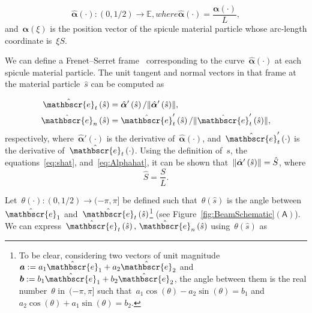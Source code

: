 \documentclass[preprint,10pt,times]{elsarticle}
\numberwithin{equation}{section}
\newcommand{\ndL}{L}
\newcommand{\physe}{\hat{\mathbscr{e}}} %
\renewcommand{\u}[1]{\boldsymbol{#1}}
\newcommand{\pr}[1]{\left( #1 \right)}
\newcommand{\norm}[1]{\ensuremath \lVert #1 \rVert}
\newcommand{\subf}[1]{\pr{\textsf{#1}}}
\begin{document}
\begin{subequations}
\begin{equation}
\hat{\u{\alpha}}(\cdot):(0,1/2)\to\mathbb{E},
\end{equation}
where
\begin{equation}
\hat{\u{\alpha}}\pr{\cdot} =\frac{\u{\alpha}\pr{\cdot}}{\ndL} ,
\end{equation}
\label{eq:Alphahat}
\end{subequations}
and~$\u{\alpha}\pr{\xi}$ is the position vector
of the spicule material particle whose arc-length coordinate is~$\xi S$.

We can define a Frenet--Serret frame~\cite{forsyth1912lectures}
corresponding to the curve~$\hat{\u{\alpha}}(\cdot)$
at each spicule material particle. The unit tangent and normal vectors
in that frame at the material particle~$\hat{s}$ can be computed
as

\begin{subequations}
\begin{align}
\label{eq:Tvec}
\physe_{t}\pr{\hat{s}}&=\hat{\u{\alpha}}'\pr{\hat{s}}/\norm{\hat{\u{\alpha}}'\pr{\hat{s}}},\\
\label{eq:Nvec}
\physe_{n}\pr{\hat{s}}&=\physe_{t}'\pr{\hat{s}}/\norm{\physe_{t}'\pr{\hat{s}}},
\end{align}
\end{subequations}respectively, where~$\hat{\u{\alpha}}'\pr{\cdot}$ is the derivative
of~$\hat{\u{\alpha}}\pr{\cdot}$, and~$\physe_{t}'\pr{\cdot}$ is
the derivative of~$\physe_{t}\pr{\cdot}$. Using the definition of~$s$,
the equations~\eqref{eq:shat}, and~\eqref{eq:Alphahat}, it can
be shown that~$\norm{\hat{\u{\alpha}}'\pr{\hat{s}}} =\hat{S}${,
where}\begin{equation}\label{eq:Shat}
\hat{S} =\frac{S}{\ndL}  .\end{equation}

Let~$\theta\pr{\cdot}:(0,1/2)\to (-\pi,\pi]$
be defined such that~$\theta\pr{\hat{s}}$ is
the angle between~$\physe_1$ and~$\physe_{t}\pr{\hat{s}}$\footnote{To be clear, considering two vectors of unit magnitude~$\u{a} := a_1\physe_1 + a_2\physe_2$
and~$\u{b}:=b_1\physe_1 + b_2\physe_2$, the angle between them is
the real number~$\theta$ in~$(-\pi,\pi]$ such that~$a_1\cos(\theta)- a_2\sin(\theta) = b_1$
and~$a_2\cos(\theta) + a_1\sin(\theta) = b_2$.} (see Figure~\ref{fig:BeamSchematic}$\subf{A}$). We can express~$\physe_{t}\pr{\hat{s}},\,\physe_{n}\pr{\hat{s}}$
using~$\theta(\hat{s})$ as
\end{document}
